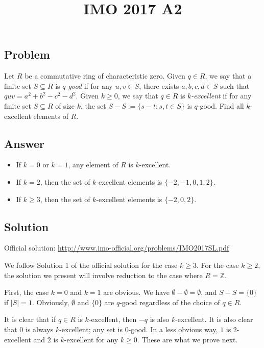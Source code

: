 \documentclass{article}
\title{IMO 2017 A2}
\author{}
\date{}
\newcommand{\Z}{\mathbb{Z}}
\begin{document}
\maketitle



\subsection*{Problem}

Let $R$ be a commutative ring of characteristic zero.
Given $q \in R$, we say that a finite set $S \subseteq R$ is \emph{$q$-good} if for any $u, v \in S$, there exists $a, b, c, d \in S$ such that $quv = a^2 + b^2 - c^2 - d^2$.
Given $k \geq 0$, we say that $q \in R$ is \emph{$k$-excellent} if for any finite set $S \subseteq R$ of size $k$, the set $S - S := \{s - t : s, t \in S\}$ is $q$-good.
Find all $k$-excellent elements of $R$.


\subsection*{Answer}

\begin{itemize}
    \item If $k = 0$ or $k = 1$, any element of $R$ is $k$-excellent.
    \item If $k = 2$, then the set of $k$-excellent elements is $\{-2, -1, 0, 1, 2\}$.
    \item If $k \geq 3$, then the set of $k$-excellent elements is $\{-2, 0, 2\}$.
\end{itemize}



\subsection*{Solution}

Official solution: \url{http://www.imo-official.org/problems/IMO2017SL.pdf}

We follow Solution 1 of the official solution for the case $k \geq 3$.
For the case $k \geq 2$, the solution we present will involve reduction to the case where $R = \Z$.

First, the case $k = 0$ and $k = 1$ are obvious.
We have $\emptyset - \emptyset = \emptyset$, and $S - S = \{0\}$ if $|S| = 1$.
Obviously, $\emptyset$ and $\{0\}$ are $q$-good regardless of the choice of $q \in R$.

It is clear that if $q \in R$ is $k$-excellent, then $-q$ is also $k$-excellent.
It is also clear that $0$ is always $k$-excellent; any set is $0$-good.
In a less obvious way, $1$ is $2$-excellent and $2$ is $k$-excellent for any $k \geq 0$.
These are what we prove next.
\end{document}

